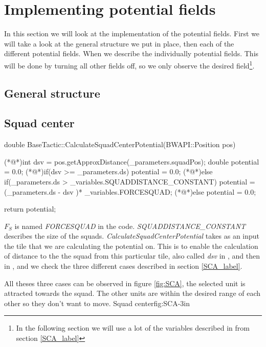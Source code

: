 {\color[rgb]{0.000000,0.000000,0.000000}\section{Implementing potential fields}
	In this section we will look at the implementation of the potential fields.
	First we will take a look at the general structure we put in place, then each of the different potential fields. When we describe the individually potential fields. This will be done by turning all other fields off, so we only observe the desired field\footnote{In the following section we will use a lot of the variables described in from section \ref{SCA_label}}.
	
	\subsection{General structure}
	
	
	
	\subsection{Squad center}	
		\begin{Sourcecode}[caption=Squad center]
double BaseTactic::CalculateSquadCenterPotential(BWAPI::Position pos)
{
	(*@\lnote@*)int dsv = pos.getApproxDistance(_parameters.squadPos);	
	double potential = 0.0;
	(*@\lnote@*)if(dsv >= _parameters.ds)
		potential = 0.0;
	(*@\lnote@*)else if(_parameters.ds > _variables.SQUADDISTANCE_CONSTANT)
		potential = (_parameters.ds - dsv )* _variables.FORCESQUAD;
	(*@\lnote@*)else
		potential = 0.0;

	return potential;
}
\end{Sourcecode}
		$F_{S}$ is named \textit{FORCESQUAD} in the code.
		\textit{SQUADDISTANCE\_CONSTANT} describes the size of the squads. 
		\textit{CalculateSquadCenterPotential} takes as an input the tile that we are calculating the potential on. This is to enable the calculation of distance to the the squad from this particular tile, also called \textit{dsv} in , and then in , and  we check the three different cases described in section \ref{SCA_label}.		
		
		All theses three cases can be observed in figure \ref{fig:SCA}, the selected unit is attracted towards the squad. The other units are within the desired range of each other so they don't want to move.
			{Squad center}{fig:SCA}{-3in}
				 
}
